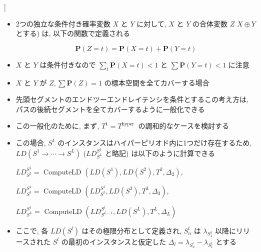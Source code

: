 \begin{frame}{}
    \begin{definition}[Coalescion [3]]
        \setlength{\linewidth}{0.98\columnwidth}
        \begin{itemize}
            \item 2つの独立な条件付き確率変数 $X$ と $Y$ に対して, $X$ と $Y$ の合体変数 $Z$ $X \oplus Y$ とする) は, 以下の関数で定義される

                  \begin{equation*}
                      \mathbf{P}(Z=t)=\mathbf{P}(X=t)+\mathbf{P}(Y=t)
                  \end{equation*}

            \item $X$ と $Y$ は条件付きなので $\sum_{t} \mathbf{P}(X=t)<1$ と $\sum \mathbf{P}(Y=t)<1$ に注意
\item $X$ と $Y$ が $Z, \sum \mathbf{P}(Z)=1$ の標本空間を全てカバーする場合
        \end{itemize}
    \end{definition}
\end{frame}

\begin{frame}{}
    \begin{itemize}
        \item 先頭セグメントのエンドツーエンドレイテンシを条件とするこの考え方は, パスの後続セグメントを全てカバーするように一般化できる
\item この一般化のために, まず, $T^{1}=T^{\text {hyper }}$ の調和的なケースを検討する
\item この場合, $S^{1}$ のインスタンスはハイパーピリオド内に1つだけ存在するため, $L D\left(S^{1} \rightarrow \cdots \rightarrow S^{L}\right)$ ($L D_{S^{L}}^{S^{1}}$ と略記) は以下のように計算できる

              $L D_{S^{2}}^{S^{1}}=$ ComputeLD $\left(L D\left(S^{1}\right), L D\left(S^{2}\right), T^{2}, \Delta_{2}\right)$,

              $L D_{S^{3}}^{S^{1}}=$ ComputeLD $\left(L D_{S^{2}}^{S^{1}}, L D\left(S^{3}\right), T^{3}, \Delta_{3}\right)$,

              $L D_{S^{L}}^{S^{1}}=$ ComputeLD $\left(L D_{S^{L-1}}^{S^{1}}, L D\left(S^{L}\right), T^{L}, \Delta_{L}\right)$

        \item ここで, 各 $L D\left(S^{l}\right)$ はその極限分布として定義され, $S_{n}^{l}$ は $\lambda_{S_{1}^{1}}$ 以降にリリースされた $S^{l}$ の最初のインスタンスと仮定した $\Delta_{l}=\lambda_{S_{n}^{l}}-\lambda_{S_{1}^{1}}$ とする
    \end{itemize}
\end{frame}

